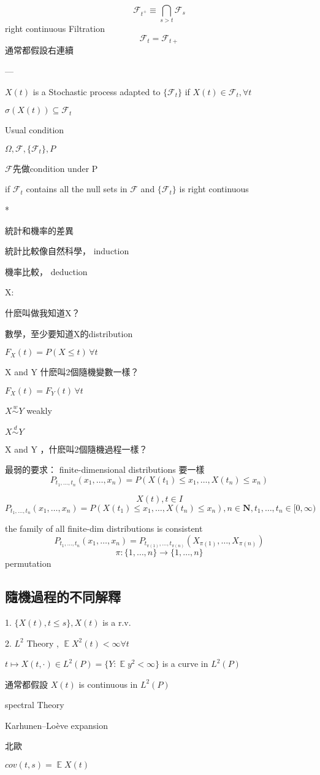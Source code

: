 \documentclass[UTF8,a4paper,14pt]{ctexart}
\DeclareMathOperator{\E}{\mathbb{E}}
\theoremstyle{definition}
\theoremstyle{remark}
\begin{document}
\[\mathcal{F}_{t^{+}}\equiv \underset{s>t}{\bigcap}\mathcal{F}_s \]
right continuous Filtration
\[\mathcal{F}_t = \mathcal{F}_{t+}\]
通常都假設右連續

---

\(X(t)\) is a Stochastic process adapted to \(\{\mathcal{F}_t\}\) if \(X(t)\in\mathcal{F}_t, \forall t\)

\(\sigma(X(t))\subseteq \mathcal{F}_t \)

Usual condition 

\(\Omega, \mathcal{F}, \{\mathcal{F}_t\},P\)

\(\mathcal{F}\)先做condition under P

if \(\mathcal{F}_t\) contains all the null sets in \(\mathcal{F}\) and \(\{\mathcal{F}_t\}\) is right continuous

*

統計和機率的差異

統計比較像自然科學， induction

機率比較， deduction

X:

什麽叫做我知道X？

數學，至少要知道X的distribution

\(F_X(t) = P(X \leq t)\,  \forall t\)

X and Y 什麽叫2個隨機變數一樣？

\(F_X(t) =F_Y(t) \, \forall t\)

\(X\overset{w}{\sim}Y\) weakly

\(X\overset{d}{\sim}Y\)


X and Y ，什麽叫2個隨機過程一樣？

最弱的要求：
finite-dimensional distributions 要一樣
\[P_{t_1,\ldots,t_n}(x_1,\ldots,x_n) = P(X(t_1)\leq x_1,\ldots,X(t_n)\leq x_n)\]

\[X(t),t\in I\]
\[P_{t_1,\ldots,t_n}(x_1,\ldots,x_n) = P(X(t_1)\leq x_1,\ldots,X(t_n)\leq x_n), n\in\mathbf{N} ,t_1,\ldots,t_n \in [0,\infty)\]

the family of all finite-dim distributions is consistent
\[P_{t_1,\ldots,t_n}(x_1,\ldots,x_n) = P_{t_{\pi(1)},\ldots,t_{\pi(n)}}(X_{\pi(1)},\ldots,X_{\pi(n)})\]
\[\pi:\{1,\ldots,n\}\rightarrow \{1,\ldots,n\} \]
permutation


\subsection{隨機過程的不同解釋}
1. \(\{X(t),t\leq s\},X(t)\) is a r.v.


2. \(L^2\) Theory , \(\E X^2(t) <\infty \forall t\)

\(t \mapsto X(t,\cdot )\in L^2(P)=\{Y:\E y^2 <\infty\} \)
is a curve in \(L^2(P)\)

通常都假設
\(X(t) \) is continuous in \(L^2(P) \)

spectral Theory

Karhunen–Loève expansion

北歐

\(cov(t,s) = \E X(t)\)
\end{document}
